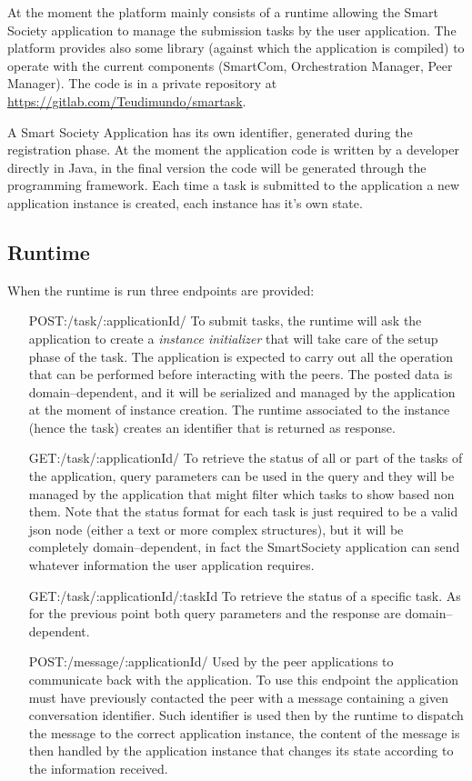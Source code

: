 At the moment the platform mainly consists of a runtime allowing the Smart Society application to manage the submission tasks by the user application. The platform provides also some library (against which the application is compiled) to operate with the current components (SmartCom, Orchestration Manager, Peer Manager). The code is in a private repository at \url{https://gitlab.com/Teudimundo/smartask}.

A Smart Society Application has its own identifier, generated during the registration phase. At the moment the application code is written by a developer directly in Java, in the final version the code will be generated through the programming framework. Each time a task is submitted to the application a new application instance is created, each instance has it's own state.

\subsection{Runtime}

When the runtime is run three endpoints are provided: 

\begin{itemize}
\item[POST:/task/:applicationId/] To submit tasks, the runtime will ask the application to create a \textit{instance initializer} that will take care of the setup phase of the task. The application is expected to carry out all the operation that can be performed before interacting with the peers. The posted data is domain--dependent, and it will be serialized and managed by the application at the moment of instance creation. The runtime associated to the instance (hence the task) creates an identifier that is returned as response.

\item[GET:/task/:applicationId/] To retrieve the status of all or part of the tasks of the application, query parameters can be used in the query and they will be managed by the application that might filter which tasks to show based non them. Note that the status format for each task is just required to be a valid json node (either a text or more complex structures), but it will be completely domain--dependent, in fact the SmartSociety application can send whatever information the user application requires.

\item[GET:/task/:applicationId/:taskId] To retrieve the status of a specific task. As for the previous point both query parameters and the response are domain--dependent. 

\item[POST:/message/:applicationId/] Used by the peer applications to communicate back with the application. To use this endpoint the application must have previously contacted the peer with a message containing a given conversation identifier. Such identifier is used then by the runtime to dispatch the message to the correct application instance, the content of the message is then handled by the application instance that  changes its state according to the information received.

\end{itemize}

